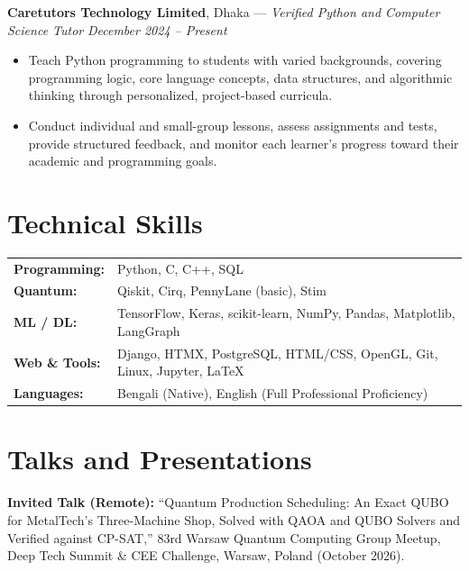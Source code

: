 \documentclass[a4paper,10pt]{article}
\begin{document}
\vspace{2pt}
\textbf{Caretutors Technology Limited}, Dhaka --- \textit{Verified Python and Computer Science Tutor}
\hfill
\textit{December 2024 -- Present}

\begin{itemize}
    \item Teach Python programming to students with varied backgrounds, covering programming logic, core language concepts, data structures, and algorithmic thinking through personalized, project-based curricula.

    \item Conduct individual and small-group lessons, assess assignments and tests, provide structured feedback, and monitor each learner's progress toward their academic and programming goals.
\end{itemize}

\section*{Technical Skills}

\begin{tabularx}{\textwidth}{@{}lX@{}}
\textbf{Programming:} & Python, C, C++, SQL \\
\textbf{Quantum:} & Qiskit, Cirq, PennyLane (basic), Stim \\
\textbf{ML / DL:} & TensorFlow, Keras, scikit-learn, NumPy, Pandas, Matplotlib, LangGraph \\
\textbf{Web \& Tools:} & Django, HTMX, PostgreSQL, HTML/CSS, OpenGL, Git, Linux, Jupyter, LaTeX \\
\textbf{Languages:} & Bengali (Native), English (Full Professional Proficiency) \\
\end{tabularx}

\section*{Talks and Presentations}

\textbf{Invited Talk (Remote):}
``Quantum Production Scheduling: An Exact QUBO for MetalTech's Three-Machine Shop, Solved with QAOA and QUBO Solvers and Verified against CP-SAT,''
83rd Warsaw Quantum Computing Group Meetup, Deep Tech Summit \& CEE Challenge, Warsaw, Poland (October 2026).
\end{document}
